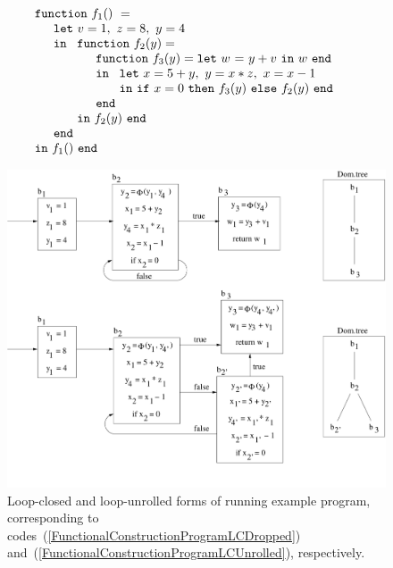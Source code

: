 \begin{equation}
\label{FunctionalConstructionProgramLCDropped}
\begin{array}{l}
\mathtt{function}\ f_1()\ = \\
  \quad
  \begin{array}{l}
     \mathtt{let}\ v = 1, \ 
                   z = 8, \ 
                   y = 4\\
     \mathtt{in}\ 
     \begin{array}[t]{l}
       \mathtt{function}\ f_2(y) = \\
       \quad \begin{array}{l}  
               \mathtt{function}\ f_3(y) = \letin w {y+v} w\\
               \mathtt{in}\
               \begin{array}[t]{l}
                  \mathtt{let}\ x = {5+y}, \
                                y = {x*z}, \
                                x = {x-1}\\
                  \mathtt{in}\ 
                     \ite {x=0} {\call {f_3} {y}} {\call {f_2} {y}}\
                  \mathtt{end}
               \end{array}\\
               \mathtt{end}
             \end{array}\\
       \mathtt{in}\ f_2(y)\ \mathtt{end}
     \end{array}\\
     \mathtt{end}
  \end{array}\\
  \mathtt{in}\ f_1()\ \mathtt{end}
\end{array}
\end{equation}
\begin{figure}
\begin{center}
\includegraphics[scale=0.4]{SSAConstructionExample6}
\end{center}
\caption{\label{fig:FunctionalCorrespondenceSSAofLoopClosedProgramNEW} 
Loop-closed and loop-unrolled forms of running example program,
corresponding to codes~(\ref{FunctionalConstructionProgramLCDropped})
and~(\ref{FunctionalConstructionProgramLCUnrolled}), respectively.}
\end{figure}
